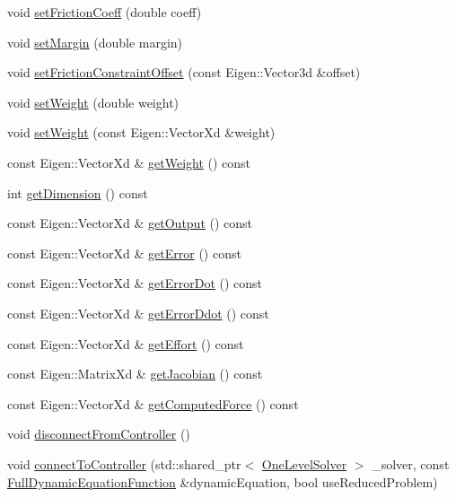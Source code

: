\begin{DoxyCompactItemize}
\item 
void \hyperlink{classocra_1_1Task_ae37c47d2481ebfa034dc79cbf149776a}{set\+Friction\+Coeff} (double coeff)
\item 
void \hyperlink{classocra_1_1Task_a62b7814143aa571cc668fef9bdea6815}{set\+Margin} (double margin)
\item 
void \hyperlink{classocra_1_1Task_ac3738872a446ffc6361d096659ae2ba6}{set\+Friction\+Constraint\+Offset} (const Eigen\+::\+Vector3d \&offset)
\item 
void \hyperlink{classocra_1_1Task_a857ee8b756c78d5a90cdc78ae6eb855e}{set\+Weight} (double weight)
\item 
void \hyperlink{classocra_1_1Task_a81589c3855f9f39526d9d4ceda6fe95e}{set\+Weight} (const Eigen\+::\+Vector\+Xd \&weight)
\item 
const Eigen\+::\+Vector\+Xd \& \hyperlink{classocra_1_1Task_ae2b875972ff294578c1d65feddcf81ac}{get\+Weight} () const
\item 
int \hyperlink{classocra_1_1Task_a12b60082f3f87274db964b7844af816e}{get\+Dimension} () const
\item 
const Eigen\+::\+Vector\+Xd \& \hyperlink{classocra_1_1Task_a61314a6ce8b06d8fbe3df06050b0ed4b}{get\+Output} () const
\item 
const Eigen\+::\+Vector\+Xd \& \hyperlink{classocra_1_1Task_a3999ed88dfb201e364ee91b49f609405}{get\+Error} () const
\item 
const Eigen\+::\+Vector\+Xd \& \hyperlink{classocra_1_1Task_a2f3a57806fc7ca1b539f71a49a14d58b}{get\+Error\+Dot} () const
\item 
const Eigen\+::\+Vector\+Xd \& \hyperlink{classocra_1_1Task_a3811e23ef354c6aea47f269f850d8e69}{get\+Error\+Ddot} () const
\item 
const Eigen\+::\+Vector\+Xd \& \hyperlink{classocra_1_1Task_abd81ebbd3029da1cf9581c52d25aa4fc}{get\+Effort} () const
\item 
const Eigen\+::\+Matrix\+Xd \& \hyperlink{classocra_1_1Task_ae9a3a6ca73165b0a148f6e3a26c9961d}{get\+Jacobian} () const
\item 
const Eigen\+::\+Vector\+Xd \& \hyperlink{classocra_1_1Task_af41c0c9d72e1b9511567b06febe11a62}{get\+Computed\+Force} () const
\item 
void \hyperlink{classocra_1_1Task_a3d780dc6817552070f3d5570a9052e3f}{disconnect\+From\+Controller} ()
\item 
void \hyperlink{classocra_1_1Task_a38f7a4e8bcf2bd502c606f2b536b6f52}{connect\+To\+Controller} (std\+::shared\+\_\+ptr$<$ \hyperlink{classocra_1_1OneLevelSolver}{One\+Level\+Solver} $>$ \+\_\+solver, const \hyperlink{classocra_1_1FullDynamicEquationFunction}{Full\+Dynamic\+Equation\+Function} \&dynamic\+Equation, bool use\+Reduced\+Problem)
\end{DoxyCompactItemize}
